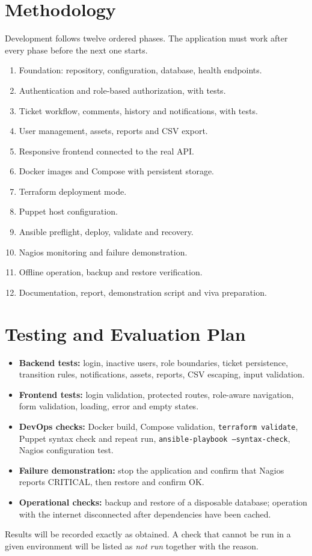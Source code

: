 \documentclass[12pt,a4paper]{article}
\begin{document}
\section{Methodology}
Development follows twelve ordered phases. The application must work after every phase before the next one starts.
\begin{enumerate}[leftmargin=*]
  \item Foundation: repository, configuration, database, health endpoints.
  \item Authentication and role-based authorization, with tests.
  \item Ticket workflow, comments, history and notifications, with tests.
  \item User management, assets, reports and CSV export.
  \item Responsive frontend connected to the real API.
  \item Docker images and Compose with persistent storage.
  \item Terraform deployment mode.
  \item Puppet host configuration.
  \item Ansible preflight, deploy, validate and recovery.
  \item Nagios monitoring and failure demonstration.
  \item Offline operation, backup and restore verification.
  \item Documentation, report, demonstration script and viva preparation.
\end{enumerate}

\section{Testing and Evaluation Plan}
\begin{itemize}[leftmargin=*]
  \item \textbf{Backend tests:} login, inactive users, role boundaries, ticket persistence, transition rules, notifications, assets, reports, CSV escaping, input validation.
  \item \textbf{Frontend tests:} login validation, protected routes, role-aware navigation, form validation, loading, error and empty states.
  \item \textbf{DevOps checks:} Docker build, Compose validation, \texttt{terraform validate}, Puppet syntax check and repeat run, \texttt{ansible-playbook --syntax-check}, Nagios configuration test.
  \item \textbf{Failure demonstration:} stop the application and confirm that Nagios reports CRITICAL, then restore and confirm OK.
  \item \textbf{Operational checks:} backup and restore of a disposable database; operation with the internet disconnected after dependencies have been cached.
\end{itemize}
Results will be recorded exactly as obtained. A check that cannot be run in a given environment will be listed as \emph{not run} together with the reason.
\end{document}
